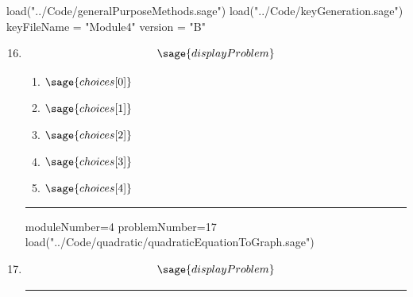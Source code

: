 \documentclass[14pt]{article}
\newcommand{\litem}[1]{\item#1\hspace*{-1cm}\rule{\textwidth}{0.4pt}}
\begin{document}
\pagestyle{fancy}

\begin{sagesilent}
load("../Code/generalPurposeMethods.sage")
load("../Code/keyGeneration.sage")
keyFileName = "Module4"
version = "B"
\end{sagesilent}

\begin{enumerate}
\setcounter{enumi}{15}


\begin{sagesilent}
moduleNumber=4
problemNumber=16
load("../Code/quadratic/quadraticFormula.sage")
\end{sagesilent}

\litem{ 
	\[ \sage{displayProblem} \]

	\begin{enumerate}[label=\Alph*.]
    \item \( \sage{choices[0]} \)
    \item \( \sage{choices[1]} \)
    \item \( \sage{choices[2]} \)
    \item \( \sage{choices[3]} \)
    \item \( \sage{choices[4]} \)
	\end{enumerate}
}

\begin{sagesilent}
moduleNumber=4
problemNumber=17
load("../Code/quadratic/quadraticEquationToGraph.sage")
\end{sagesilent}

\litem{ 

\[ \sage{displayProblem} \]

}
\end{enumerate}
\end{document}
